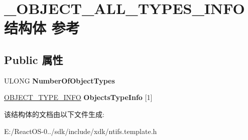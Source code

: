 \hypertarget{struct___o_b_j_e_c_t___a_l_l___t_y_p_e_s___i_n_f_o}{}\section{\+\_\+\+O\+B\+J\+E\+C\+T\+\_\+\+A\+L\+L\+\_\+\+T\+Y\+P\+E\+S\+\_\+\+I\+N\+F\+O结构体 参考}
\label{struct___o_b_j_e_c_t___a_l_l___t_y_p_e_s___i_n_f_o}
\subsection*{Public 属性}
\begin{DoxyCompactItemize}
\item 
\mbox{\label{struct___o_b_j_e_c_t___a_l_l___t_y_p_e_s___i_n_f_o_a0111a8677e7fe93af1fd59a564000377}} 
U\+L\+O\+NG {\bfseries Number\+Of\+Object\+Types}
\item 
\mbox{\label{struct___o_b_j_e_c_t___a_l_l___t_y_p_e_s___i_n_f_o_ab75e63acf905fc6b81183570c75dfc3a}} 
\hyperlink{struct___o_b_j_e_c_t___t_y_p_e___i_n_f_o}{O\+B\+J\+E\+C\+T\+\_\+\+T\+Y\+P\+E\+\_\+\+I\+N\+FO} {\bfseries Objects\+Type\+Info} \mbox{[}1\mbox{]}
\end{DoxyCompactItemize}


该结构体的文档由以下文件生成\+:\begin{DoxyCompactItemize}
\item 
E\+:/\+React\+O\+S-\/0../sdk/include/xdk/ntifs.\+template.\+h\end{DoxyCompactItemize}
